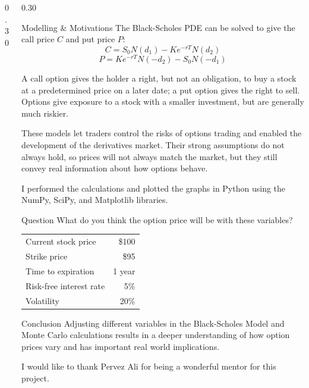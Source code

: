 \documentclass[final]{beamer}
\begin{document}
\begin{frame}[t]
\begin{columns}[t]
\begin{column}{0.30\paperwidth}
\end{column}

\begin{column}{0.30\paperwidth}

\begin{block}{Modelling \& Motivations}
The Black-Scholes PDE can be solved to give the call price $C$ and put price $P$:
\[ C = S_0 N(d_1) - K e^{-rT} N(d_2) \]
\[ P = K e^{-rT} N(-d_2) - S_0 N(-d_1) \]

A call option gives the holder a right, but not an obligation, to buy a stock at a predetermined price on a later date; a put option gives the right to sell. Options give exposure to a stock with a smaller investment, but are generally much riskier.

These models let traders control the risks of options trading and enabled the development of the derivatives market. Their strong assumptions do not always hold, so prices will not always match the market, but they still convey real information about how options behave.

I performed the calculations and plotted the graphs in Python using the NumPy, SciPy, and Matplotlib libraries.
\end{block}

\begin{block}{Question}
What do you think the option price will be with these variables?

\begin{center}
\renewcommand{\arraystretch}{1.2}
\begin{tabular}{l r}
\hline
Current stock price & \$100 \\
Strike price & \$95 \\
Time to expiration & 1 year \\
Risk-free interest rate & 5\% \\
Volatility & 20\% \\
\hline
\end{tabular}
\end{center}
\end{block}

\begin{block}{Conclusion}
Adjusting different variables in the Black-Scholes Model and Monte Carlo calculations results in a deeper understanding of how option prices vary and has important real world implications.

I would like to thank Pervez Ali for being a wonderful mentor for this project.
\end{block}

\end{column}

\end{columns}
\end{frame}
\end{document}
